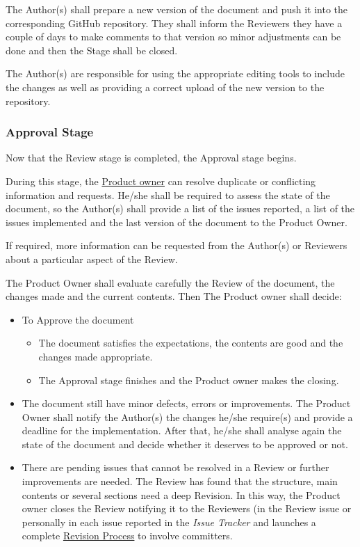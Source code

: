 \documentclass{template/openetcs_article}
\begin{document}
The Author(s) shall prepare a new version of the document and push it into the corresponding GitHub repository. They shall inform the Reviewers they have a couple of days to make comments to that version so minor adjustments can be done and then the Stage shall be closed.

The Author(s) are responsible for using the appropriate editing tools to include the changes as well as providing a correct upload of the new version to the repository.

\subsubsection{Approval Stage}

Now that the Review stage is completed, the Approval stage begins. 

During this stage, the \underline{Product owner} can resolve duplicate or
conflicting information and requests. He/she shall be required to assess the state of the document, so the Author(s) shall provide a list of the issues reported, a list of the issues implemented and the last version of the document to the Product Owner.

If required, more information can be requested from the Author(s) or Reviewers about a
particular aspect of the Review. 

The Product Owner shall evaluate carefully the Review of the document, the changes made and the current contents. Then The Product owner shall decide:

\begin{itemize}
\item To Approve the document
\begin{itemize}
\item The document satisfies the expectations, the contents are good and the changes made appropriate. 
\item The Approval stage finishes and the Product owner makes the closing.
\end{itemize}
\item The document still have minor defects, errors or improvements. The Product Owner shall notify the Author(s) the changes he/she require(s) and provide a deadline for the implementation. After that, he/she shall analyse again the state of the document and decide whether it deserves to be approved or not.
\item There are pending issues that cannot be resolved in a Review or further improvements are needed. The Review has found that the structure, main contents or several sections need a deep Revision. In this way, the Product owner closes the Review notifying it to the Reviewers (in the Review issue or personally in each issue reported in the {\it Issue Tracker} and launches a complete \underline{Revision Process} to involve committers.
\end{itemize}
\end{document}
